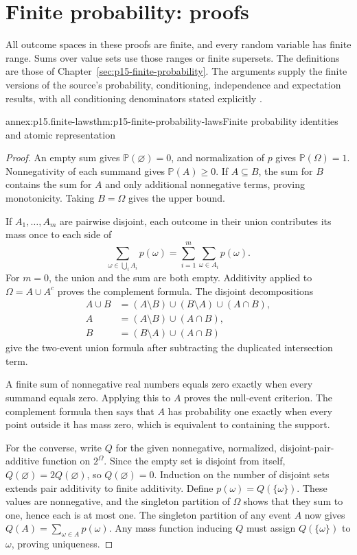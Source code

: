 \section{Finite probability: proofs}
\label{sec:annex-p15-finite-probability}

All outcome spaces in these proofs are finite, and every random variable
has finite range. Sums over value sets use those ranges or finite supersets.
The definitions are those of Chapter~\ref{sec:p15-finite-probability}. The arguments supply the
finite versions of the source's probability, conditioning, independence and
expectation results, with all conditioning denominators stated explicitly
\cite[secs.~1.2, 4.1 and 6.1]{GrinsteadSnellChance2006}.

\begin{annexitem}{annex:p15.finite-laws}{thm:p15-finite-probability-laws}{Finite probability identities and atomic representation}
\begin{proof}
An empty sum gives \(\mathbb P(\varnothing)=0\), and normalization of
\(p\) gives \(\mathbb P(\Omega)=1\). Nonnegativity of each summand
gives \(\mathbb P(A)\geq0\). If \(A\subseteq B\), the sum for
\(B\) contains the sum for \(A\) and only additional nonnegative
terms, proving monotonicity. Taking \(B=\Omega\) gives the upper bound.

If \(A_1,\ldots,A_m\) are pairwise disjoint, each outcome in their
union contributes its mass once to each side of
\[
 \sum_{\omega\in\bigcup_i A_i}p(\omega)
 =\sum_{i=1}^m\sum_{\omega\in A_i}p(\omega).
\]
For \(m=0\), the union and the sum are both empty. Additivity applied
to \(\Omega=A\cup A^c\) proves the complement formula.
The disjoint decompositions
\[
\begin{aligned}
 A\cup B&=(A\setminus B)\cup(B\setminus A)\cup(A\cap B),\\
 A&=(A\setminus B)\cup(A\cap B),\\
 B&=(B\setminus A)\cup(A\cap B)
\end{aligned}
\]
give the two-event union formula after subtracting the duplicated
intersection term.

A finite sum of nonnegative real numbers equals zero exactly when every
summand equals zero. Applying this to \(A\) proves the null-event
criterion. The complement formula then says that \(A\) has probability
one exactly when every point outside it has mass zero, which is equivalent
to containing the support.

For the converse, write \(Q\) for the given nonnegative, normalized,
disjoint-pair-additive function on \(2^\Omega\). Since the empty set is
disjoint from itself, \(Q(\varnothing)=2Q(\varnothing)\), so
\(Q(\varnothing)=0\). Induction on the number of disjoint sets extends
pair additivity to finite additivity. Define \(p(\omega)=Q(\{\omega\})\).
These values are nonnegative, and the singleton partition of \(\Omega\)
shows that they sum to one, hence each is at most one. The singleton
partition of any event \(A\) now gives
\(Q(A)=\sum_{\omega\in A}p(\omega)\). Any mass function inducing
\(Q\) must assign \(Q(\{\omega\})\) to \(\omega\), proving uniqueness.
\end{proof}
\end{annexitem}

